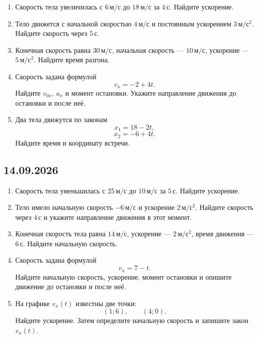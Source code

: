 \documentclass[a4paper,12pt]{article}
\begin{document}
\begin{enumerate}[label=\textbf{\arabic*.}]

  \item Скорость тела увеличилась с
  \(6\,\text{м}/\text{с}\)
  до
  \(18\,\text{м}/\text{с}\)
  за
  \(4\,\text{с}\).
  Найдите ускорение.

  \item Тело движется с начальной скоростью
  \(4\,\text{м}/\text{с}\)
  и постоянным ускорением
  \(3\,\text{м}/\text{с}^2\).
  Найдите скорость через
  \(5\,\text{с}\).

  \item Конечная скорость равна
  \(30\,\text{м}/\text{с}\),
  начальная скорость ---
  \(10\,\text{м}/\text{с}\),
  ускорение ---
  \(5\,\text{м}/\text{с}^2\).
  Найдите время разгона.

  \item Скорость задана формулой
  \[
    v_x=-2+4t.
  \]
  Найдите \(v_{0x}\), \(a_x\) и момент остановки.
  Укажите направление движения до остановки и после неё.

  \item Два тела движутся по законам
  \[
    x_1=18-2t,
  \]
  \[
    x_2=-6+4t.
  \]
  Найдите время и координату встречи.

\end{enumerate}


\subsection*{14.09.2026}

\begin{enumerate}[label=\textbf{\arabic*.}]

  \item Скорость тела уменьшилась с
  \(25\,\text{м}/\text{с}\)
  до
  \(10\,\text{м}/\text{с}\)
  за
  \(5\,\text{с}\).
  Найдите ускорение.

  \item Тело имело начальную скорость
  \(-6\,\text{м}/\text{с}\)
  и ускорение
  \(2\,\text{м}/\text{с}^2\).
  Найдите скорость через
  \(4\,\text{с}\)
  и укажите направление движения в этот момент.

  \item Конечная скорость тела равна
  \(14\,\text{м}/\text{с}\),
  ускорение ---
  \(2\,\text{м}/\text{с}^2\),
  время движения ---
  \(6\,\text{с}\).
  Найдите начальную скорость.

  \item Скорость задана формулой
  \[
    v_x=7-t.
  \]
  Найдите начальную скорость, ускорение, момент остановки и опишите движение до остановки и после неё.

  \item На графике \(v_x(t)\) известны две точки:
  \[
    (1;6),
    \qquad
    (4;0).
  \]
  Найдите ускорение. Затем определите начальную скорость и запишите закон \(v_x(t)\).

\end{enumerate}
\end{document}
